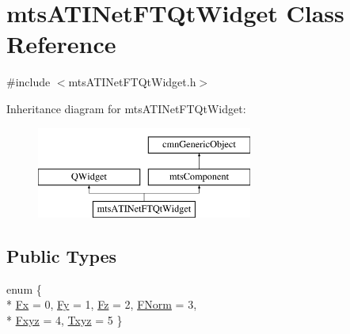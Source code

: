 \hypertarget{classmts_a_t_i_net_f_t_qt_widget}{}\section{mts\+A\+T\+I\+Net\+F\+T\+Qt\+Widget Class Reference}
\label{classmts_a_t_i_net_f_t_qt_widget}


{\ttfamily \#include $<$mts\+A\+T\+I\+Net\+F\+T\+Qt\+Widget.\+h$>$}

Inheritance diagram for mts\+A\+T\+I\+Net\+F\+T\+Qt\+Widget\+:\begin{figure}[H]
\begin{center}
\leavevmode
\includegraphics[height=3.000000cm]{dc/d5e/classmts_a_t_i_net_f_t_qt_widget}
\end{center}
\end{figure}
\subsection*{Public Types}
\begin{DoxyCompactItemize}
\item 
enum \{ \\*
\hyperlink{classmts_a_t_i_net_f_t_qt_widget_a9090a703400a2367c479e3fd3e0fc491ae583275fc5a378f94cb11497f6fc175c}{Fx} = 0, 
\hyperlink{classmts_a_t_i_net_f_t_qt_widget_a9090a703400a2367c479e3fd3e0fc491ac22fef7e562866697cac9c79ba88c887}{Fy} = 1, 
\hyperlink{classmts_a_t_i_net_f_t_qt_widget_a9090a703400a2367c479e3fd3e0fc491aa16a6c2e88cfb7160fb53fc69537a64e}{Fz} = 2, 
\hyperlink{classmts_a_t_i_net_f_t_qt_widget_a9090a703400a2367c479e3fd3e0fc491a34b6cfa3120b2b42d926f53c7215da17}{F\+Norm} = 3, 
\\*
\hyperlink{classmts_a_t_i_net_f_t_qt_widget_a9090a703400a2367c479e3fd3e0fc491aa08c4ae905f9cf6bd352474b84813ab3}{Fxyz} = 4, 
\hyperlink{classmts_a_t_i_net_f_t_qt_widget_a9090a703400a2367c479e3fd3e0fc491aae384dd0e812478ec5a53b416311fc38}{Txyz} = 5
 \}
\end{DoxyCompactItemize}
